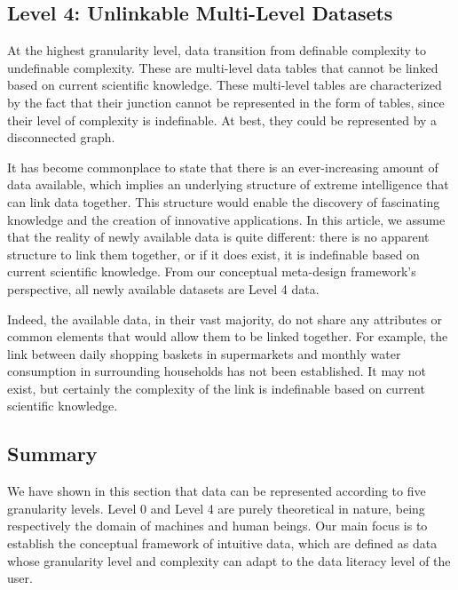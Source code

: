 \documentclass[12pt,a4paper]{article}
\begin{document}
\subsection{Level 4: Unlinkable Multi-Level Datasets}

At the highest granularity level, data transition from definable complexity to undefinable complexity. These are multi-level data tables that cannot be linked based on current scientific knowledge. These multi-level tables are characterized by the fact that their junction cannot be represented in the form of tables, since their level of complexity is indefinable. At best, they could be represented by a disconnected graph. 

\vspace{1em}

\noindent It has become commonplace to state that there is an ever-increasing amount of data available, which implies an underlying structure of extreme intelligence that can link data together. This structure would enable the discovery of fascinating knowledge and the creation of innovative applications. In this article, we assume that the reality of newly available data is quite different: there is no apparent structure to link them together, or if it does exist, it is indefinable based on current scientific knowledge. From our conceptual meta-design framework's perspective, all newly available datasets are Level 4 data.

Indeed, the available data, in their vast majority, do not share any attributes or common elements that would allow them to be linked together. For example, the link between daily shopping baskets in supermarkets and monthly water consumption in surrounding households has not been established. It may not exist, but certainly the complexity of the link is indefinable based on current scientific knowledge.

\subsection{Summary}

We have shown in this section that data can be represented according to five granularity levels. Level 0 and Level 4 are purely theoretical in nature, being respectively the domain of machines and human beings. Our main focus is to establish the conceptual framework of intuitive data, which are defined as data whose granularity level and complexity can adapt to the data literacy level of the user.
\end{document}
